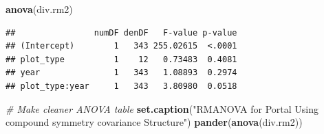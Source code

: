 \documentclass[]{article}
\newenvironment{Shaded}{\begin{snugshade}}{\end{snugshade}}
\newcommand{\KeywordTok}[1]{\textcolor[rgb]{0.13,0.29,0.53}{\textbf{{#1}}}}
\newcommand{\StringTok}[1]{\textcolor[rgb]{0.31,0.60,0.02}{{#1}}}
\newcommand{\CommentTok}[1]{\textcolor[rgb]{0.56,0.35,0.01}{\textit{{#1}}}}
\newcommand{\NormalTok}[1]{{#1}}
\begin{document}
\begin{Shaded}
\begin{Highlighting}[]
\KeywordTok{anova}\NormalTok{(div.rm2)}
\end{Highlighting}
\end{Shaded}

\begin{verbatim}
##                numDF denDF   F-value p-value
## (Intercept)        1   343 255.02615  <.0001
## plot_type          1    12   0.73483  0.4081
## year               1   343   1.08893  0.2974
## plot_type:year     1   343   3.80980  0.0518
\end{verbatim}

\begin{Shaded}
\begin{Highlighting}[]
\CommentTok{# Make cleaner ANOVA table}
\KeywordTok{set.caption}\NormalTok{(}\StringTok{"RMANOVA for Portal Using compound symmetry covariance Structure"}\NormalTok{) }
\KeywordTok{pander}\NormalTok{(}\KeywordTok{anova}\NormalTok{(div.rm2))}
\end{Highlighting}
\end{Shaded}
\end{document}
